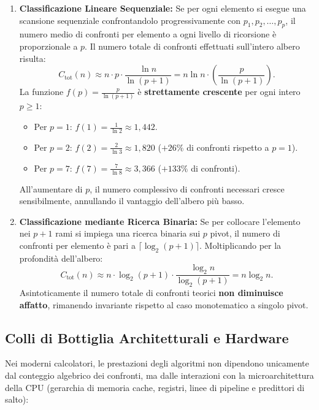 \begin{enumerate}
  \item \textbf{Classificazione Lineare Sequenziale:}
  Se per ogni elemento si esegue una scansione sequenziale confrontandolo progressivamente con $p_1, p_2, \dots, p_p$, il numero medio di confronti per elemento a ogni livello di ricorsione è proporzionale a $p$. Il numero totale di confronti effettuati sull'intero albero risulta:
  \begin{equation}
    C_{\text{tot}}(n) \approx n \cdot p \cdot \frac{\ln n}{\ln(p + 1)} = n \ln n \cdot \left( \frac{p}{\ln(p + 1)} \right).
  \end{equation}
  La funzione $f(p) = \frac{p}{\ln(p + 1)}$ è \textbf{strettamente crescente} per ogni intero $p \ge 1$:
  \begin{itemize}
    \item Per $p = 1$: $f(1) = \frac{1}{\ln 2} \approx 1{,}442$.
    \item Per $p = 2$: $f(2) = \frac{2}{\ln 3} \approx 1{,}820$ ($+26\%$ di confronti rispetto a $p=1$).
    \item Per $p = 7$: $f(7) = \frac{7}{\ln 8} \approx 3{,}366$ ($+133\%$ di confronti).
  \end{itemize}
  All'aumentare di $p$, il numero complessivo di confronti necessari cresce sensibilmente, annullando il vantaggio dell'albero più basso.

  \item \textbf{Classificazione mediante Ricerca Binaria:}
  Se per collocare l'elemento nei $p+1$ rami si impiega una ricerca binaria sui $p$ pivot, il numero di confronti per elemento è pari a $\lceil \log_2(p + 1) \rceil$. Moltiplicando per la profondità dell'albero:
  \begin{equation}
    C_{\text{tot}}(n) \approx n \cdot \log_2(p + 1) \cdot \frac{\log_2 n}{\log_2(p + 1)} = n \log_2 n.
  \end{equation}
  Asintoticamente il numero totale di confronti teorici \textbf{non diminuisce affatto}, rimanendo invariante rispetto al caso monotematico a singolo pivot.
\end{enumerate}
\FloatBarrier

\subsection{Colli di Bottiglia Architetturali e Hardware}
\label{subsec:hardware-bottlenecks}

Nei moderni calcolatori, le prestazioni degli algoritmi non dipendono unicamente dal conteggio algebrico dei confronti, ma dalle interazioni con la microarchitettura della CPU (gerarchia di memoria cache, registri, linee di pipeline e predittori di salto):

